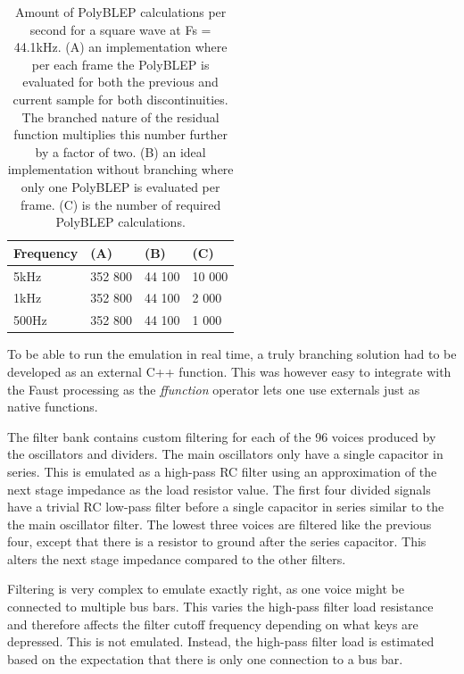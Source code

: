 \documentclass[11pt,a4paper]{article}
\begin{document}
\begin{table}[h]
 \begin{center}
\begin{tabular}{|l|l|l|l|}

      \hline
      Frequency & (A)        &  (B)         & (C) \\
      \hline\hline
      5kHz     & 352 800     & 44 100       & 10 000\\
      1kHz     & 352 800     & 44 100       &  2 000\\
      500Hz    & 352 800     & 44 100       &  1 000\\
      \hline

\end{tabular}
\caption{Amount of PolyBLEP calculations per second for a square wave at Fs = 44.1kHz. 
(A) an implementation where per each frame the PolyBLEP is evaluated for both the previous and current sample for both discontinuities. The branched nature of the residual function multiplies this number further by a factor of two.
(B) an ideal implementation without branching where only one PolyBLEP is evaluated per frame.
(C) is the number of required PolyBLEP calculations.  }\label{table:polyblep-amount}
 \end{center}
\end{table}

To be able to run the emulation in real time, a truly branching solution had to be developed as an external C++ function. This was however easy to integrate with the Faust processing as the \emph{ffunction} operator lets one use externals just as native functions.

The filter bank contains custom filtering for each of the 96 voices produced by the oscillators and dividers. The main oscillators only have a single capacitor in series. This is emulated as a high-pass RC filter using an approximation of the next stage impedance as the load resistor value. The first four divided signals have a trivial RC low-pass filter before a single capacitor in series similar to the the main oscillator filter. The lowest three voices are filtered like the previous four, except that there is a resistor to ground after the series capacitor. This alters the next stage impedance compared to the other filters.

Filtering is very complex to emulate exactly right, as one voice might be connected to multiple bus bars. This varies the high-pass filter load resistance and therefore affects the filter cutoff frequency depending on what keys are depressed. This is not emulated. Instead, the high-pass filter load is estimated based on the expectation that there is only one connection to a bus bar.
\end{document}
